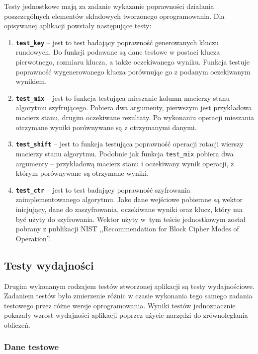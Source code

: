 \documentclass[a4paper,12pt]{article}
\begin{document}
Testy jednostkowe mają za zadanie wykazanie poprawności działania poszczególnych elementów składowych tworzonego oprogramowania.  Dla opisywanej aplikacji powstały następujące testy:
\begin{enumerate}
\item \textbf{\texttt{test\_key}} -- jest to test badający poprawność generowanych kluczu rundowych. Do funkcji podawane są dane testowe w postaci klucza pierwotnego, rozmiaru klucza, a także oczekiwanego wyniku. Funkcja testuje poprawność wygenerowanego klucza porównując go z podanym oczekiwanym wynikiem.
\item \textbf{\texttt{test\_mix}} -- jest to funkcja testująca mieszanie kolumn macierzy stanu algorytmu szyfrującego. Pobiera dwa argumenty, pierwszym jest przykładowa macierz stanu, drugim oczekiwane rezultaty. Po wykonaniu operacji mieszania otrzymane wyniki porównywane są z otrzymanymi danymi.
\item \textbf{\texttt{test\_shift}} -- jest to funkcja testująca poprawność operacji rotacji wierszy macierzy stanu algorytmu. Podobnie jak funkcja \texttt{test\_mix} pobiera dwa argumenty -- przykładową macierz stanu i oczekiwany wynik operacji, z którym porównywane są otrzymane wyniki.
\item \textbf{\texttt{test\_ctr}} -- jest to test badający poprawność szyfrowania zaimplementowanego algorytmu. Jako dane wejściowe pobierane są wektor inicjujący, dane do zaszyfrowania, oczekiwane wyniki oraz klucz, który ma być użyty do szyfrowania. Wektor użyty w~tym teście jednostkowym został pobrany z publikacji NIST ,,Recommendation for Block Cipher Modes of Operation''.
\end{enumerate}

\subsection{Testy wydajności}

Drugim wykonanym rodzajem testów stworzonej aplikacji są testy wydajnościowe. Zadaniem testów było zmierzenie różnic w czasie wykonania tego samego zadania testowego przez różne wersje oprogramowania. Wyniki testów jednoznacznie pokazały wzrost wydajności aplikacji poprzez użycie narzędzi do zrównoleglania obliczeń.

\subsubsection{Dane testowe}
\end{document}
